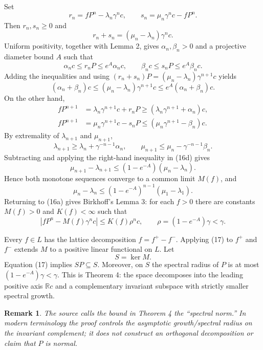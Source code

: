\documentclass[11pt]{article}
\newtheorem{remark}{Remark}
\newcommand{\R}{\mathbb{R}}
\begin{document}
Set
\[
 r_n=fP^n-\lambda_n\gamma^n c,
 \qquad
 s_n=\mu_n\gamma^n c-fP^n.
\]
Then $r_n,s_n\ge0$ and
\[
 r_n+s_n=(\mu_n-\lambda_n)\gamma^n c.
\]
Uniform positivity, together with Lemma 2, gives $\alpha_n,\beta_n>0$ and a projective diameter
bound $A$ such that
\begin{equation}
 \alpha_nc\le r_nP\le e^A\alpha_nc,
 \qquad
 \beta_nc\le s_nP\le e^A\beta_nc.
 \tag{16c}
\end{equation}
Adding the inequalities and using $(r_n+s_n)P=(\mu_n-\lambda_n)\gamma^{n+1}c$ yields
\begin{equation}
 (\alpha_n+\beta_n)c
 \le(\mu_n-\lambda_n)\gamma^{n+1}c
 \le e^A(\alpha_n+\beta_n)c.
 \tag{16d}
\end{equation}
On the other hand,
\begin{align*}
 fP^{n+1}
 &=\lambda_n\gamma^{n+1}c+r_nP
 \ge(\lambda_n\gamma^{n+1}+\alpha_n)c,\\
 fP^{n+1}
 &=\mu_n\gamma^{n+1}c-s_nP
 \le(\mu_n\gamma^{n+1}-\beta_n)c.
\end{align*}
By extremality of $\lambda_{n+1}$ and $\mu_{n+1}$,
\[
 \lambda_{n+1}\ge\lambda_n+\gamma^{-n-1}\alpha_n,
 \qquad
 \mu_{n+1}\le\mu_n-\gamma^{-n-1}\beta_n.
\]
Subtracting and applying the right-hand inequality in (16d) gives
\[
 \mu_{n+1}-\lambda_{n+1}
 \le(1-e^{-A})(\mu_n-\lambda_n).
\]
Hence both monotone sequences converge to a common limit $M(f)$, and
\[
 \mu_n-\lambda_n
 \le(1-e^{-A})^{n-1}(\mu_1-\lambda_1).
\]
Returning to (16a) gives Birkhoff's Lemma 3: for each $f>0$ there are constants $M(f)>0$ and
$K(f)<\infty$ such that
\begin{equation}
 |fP^n-M(f)\gamma^n c|\le K(f)\rho^n c,
 \qquad
 \rho=(1-e^{-A})\gamma<\gamma.
 \tag{17}
\end{equation}

Every $f\in L$ has the lattice decomposition $f=f^+-f^-$.  Applying (17) to $f^+$ and $f^-$
extends $M$ to a positive linear functional on $L$.  Let
\[
 S=\ker M.
\]
Equation (17) implies $SP\subseteq S$.  Moreover, on $S$ the spectral radius of $P$ is at most
$(1-e^{-A})\gamma<\gamma$.  This is Theorem 4: the space decomposes into the leading positive axis
$\R c$ and a complementary invariant subspace with strictly smaller spectral growth.

\begin{remark}
The source calls the bound in Theorem 4 the ``spectral norm.''  In modern terminology the proof
controls the asymptotic growth/spectral radius on the invariant complement; it does not construct an
orthogonal decomposition or claim that $P$ is normal.
\end{remark}
\end{document}
